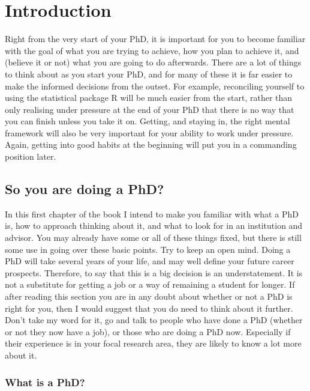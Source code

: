\documentclass[
]{krantz}
\begin{document}
\mainmatter

\hypertarget{intro}{%
\chapter{Introduction}\label{intro}}

Right from the very start of your PhD, it is important for you to become familiar with the goal of what you are trying to achieve, how you plan to achieve it, and (believe it or not) what you are going to do afterwards. There are a lot of things to think about as you start your PhD, and for many of these it is far easier to make the informed decisions from the outset. For example, reconciling yourself to using the statistical package R will be much easier from the start, rather than only realising under pressure at the end of your PhD that there is no way that you can finish unless you take it on. Getting, and staying in, the right mental framework will also be very important for your ability to work under pressure. Again, getting into good habits at the beginning will put you in a commanding position later.

\hypertarget{beforeyoustart}{%
\section{So you are doing a PhD?}\label{beforeyoustart}}

In this first chapter of the book I intend to make you familiar with what a PhD is, how to approach thinking about it, and what to look for in an institution and advisor. You may already have some or all of these things fixed, but there is still some use in going over these basic points. Try to keep an open mind. Doing a PhD will take several years of your life, and may well define your future career prospects. Therefore, to say that this is a big decision is an understatement. It is not a substitute for getting a job or a way of remaining a student for longer. If after reading this section you are in any doubt about whether or not a PhD is right for you, then I would suggest that you do need to think about it further. Don't take my word for it, go and talk to people who have done a PhD (whether or not they now have a job), or those who are doing a PhD now. Especially if their experience is in your focal research area, they are likely to know a lot more about it.

\hypertarget{what-is-a-phd}{%
\subsection{What is a PhD?}\label{what-is-a-phd}}
\end{document}
